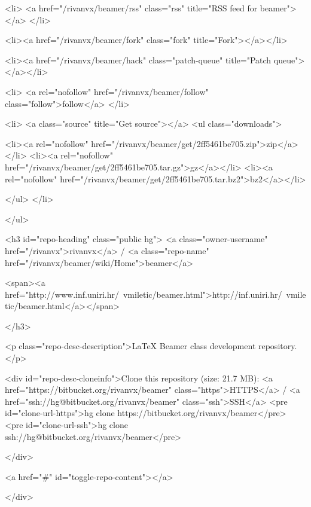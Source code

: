      
      <li>
        <a href="/rivanvx/beamer/rss" class="rss" title="RSS feed for beamer"></a>
      </li>

      <li><a href="/rivanvx/beamer/fork" class="fork" title="Fork"></a></li>
      
        
          <li><a href="/rivanvx/beamer/hack" class="patch-queue" title="Patch queue"></a></li>
        
      
      <li>
        <a rel="nofollow" href="/rivanvx/beamer/follow" class="follow">follow</a>
      </li>
      
          
      
      
        <li>
          <a class="source" title="Get source"></a>
          <ul class="downloads">
            
              
              <li><a rel="nofollow" href="/rivanvx/beamer/get/2ff5461be705.zip">zip</a></li>
              <li><a rel="nofollow" href="/rivanvx/beamer/get/2ff5461be705.tar.gz">gz</a></li>
              <li><a rel="nofollow" href="/rivanvx/beamer/get/2ff5461be705.tar.bz2">bz2</a></li>
            
          </ul>
        </li>
      
    </ul>

    <h3 id="repo-heading" class="public hg">
      <a class="owner-username" href="/rivanvx">rivanvx</a> /
      <a class="repo-name" href="/rivanvx/beamer/wiki/Home">beamer</a>
    
      <span><a href="http://www.inf.uniri.hr/~vmiletic/beamer.html">http://inf.uniri.hr/~vmiletic/beamer.html</a></span>
    

    
    </h3>

    
      <p class="repo-desc-description">LaTeX Beamer class development repository.</p>
    

  <div id="repo-desc-cloneinfo">Clone this repository (size: 21.7 MB):
    <a href="https://bitbucket.org/rivanvx/beamer" class="https">HTTPS</a> /
    <a href="ssh://hg@bitbucket.org/rivanvx/beamer" class="ssh">SSH</a>
    <pre id="clone-url-https">hg clone https://bitbucket.org/rivanvx/beamer</pre>
    <pre id="clone-url-ssh">hg clone ssh://hg@bitbucket.org/rivanvx/beamer</pre>
    
  </div>

        <a href="#" id="toggle-repo-content"></a>

        

</div>




